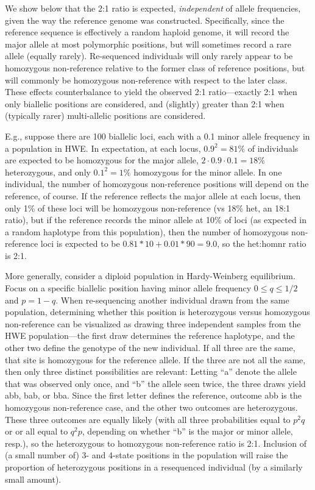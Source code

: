 \documentclass{article}\usepackage[]{graphicx}\usepackage[]{color}
\begin{document}
We show below that
the 2:1 ratio is expected, \emph{independent} of allele
frequencies, given the way the reference genome was constructed.  Specifically, since the
reference sequence is effectively a random haploid genome, it will record the
major allele at most polymorphic positions, but will sometimes record
a rare allele (equally rarely).  Re-sequenced individuals will only
rarely appear to be homozygous non-reference relative to the former
class of reference positions, but will commonly be homozygous non-reference with respect to
the later class.  These effects counterbalance to yield the
observed 2:1 ratio---exactly 2:1 when only biallelic positions are considered, and (slightly)
greater than 2:1 when (typically rarer) multi-allelic positions are considered.

E.g., suppose there are 100 biallelic loci, each with a 0.1 minor allele
frequency in a population in HWE.  In expectation, at
each locus, $0.9^2=81\%$ of individuals are expected to be homozygous for the
major allele, $2 \cdot 0.9 \cdot 0.1 = 18\%$ heterozygous, and only $0.1^2=1\%$ homozygous for the minor
allele.  In one individual, the number of homozygous non-reference
positions will depend on the reference, of course.  If the reference
reflects the major allele at each locus, then only 1\% of these loci will be homozygous non-reference (vs
18\% het, an 18:1 ratio), but if the reference records the minor
allele at 10\% of loci (as expected in a random haplotype from this population),
then the number of homozygous non-reference loci is expected to be
$0.81 * 10 + 0.01 * 90 = 9.0$, so the het:homnr ratio is 2:1.

More generally, consider a diploid 
population in Hardy-Weinberg equilibrium.  Focus on a specific biallelic position 
having minor allele frequency $0 \le q \le 1/2$ and $p = 1-q$. 
When re-sequencing another individual drawn from the same population, determining 
whether this position is heterozygous versus homozygous non-reference can be visualized as drawing 
three independent samples from the HWE population---the first draw determines the reference haplotype, and the 
other two define the genotype of the new individual.  If all three are the same, that site is 
homozygous for the reference allele.   If the three are not all the same, then only three distinct possibilities are 
relevant: Letting ``a'' denote the allele that was observed only once, and ``b'' the allele seen 
twice, the three draws yield abb, bab, or bba.  Since the first letter defines the reference, outcome
abb is the homozygous non-reference case, and the other two outcomes are heterozygous.  These three 
outcomes are equally likely (with all three probabilities equal to $p^2q$ or or all equal to $q^2p$, depending on 
whether ``b'' is the major or minor allele, resp.), so the heterozygous to homozygous non-reference ratio is 2:1.
Inclusion of (a small number of) 3- and 4-state positions in the population will raise the
proportion of heterozygous positions in a resequenced individual (by a similarly 
small amount).
\end{document}
